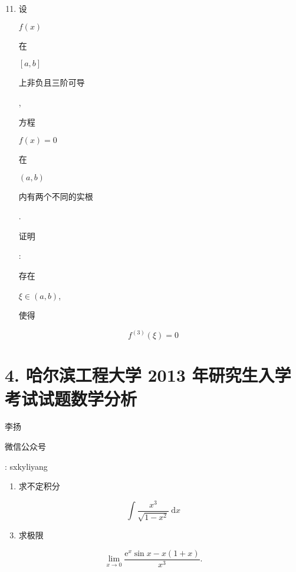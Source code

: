 \documentclass[10pt]{article}
\begin{document}
\begin{enumerate}
  \setcounter{enumi}{10}
  \item \begin{CJK}{UTF8}{mj}设\end{CJK} $f(x)$ \begin{CJK}{UTF8}{mj}在\end{CJK} $[a, b]$ \begin{CJK}{UTF8}{mj}上非负且三阶可导\end{CJK}, \begin{CJK}{UTF8}{mj}方程\end{CJK} $f(x)=0$ \begin{CJK}{UTF8}{mj}在\end{CJK} $(a, b)$ \begin{CJK}{UTF8}{mj}内有两个不同的实根\end{CJK}. \begin{CJK}{UTF8}{mj}证明\end{CJK}: \begin{CJK}{UTF8}{mj}存在\end{CJK} $\xi \in(a, b)$, \begin{CJK}{UTF8}{mj}使得\end{CJK}
\end{enumerate}
$$
f^{(3)}(\xi)=0
$$

\section{4. 哈尔滨工程大学 2013 年研究生入学考试试题数学分析}
\begin{CJK}{UTF8}{mj}李扬\end{CJK}

\begin{CJK}{UTF8}{mj}微信公众号\end{CJK}: sxkyliyang

\begin{enumerate}
  \item \begin{CJK}{UTF8}{mj}求不定积分\end{CJK}
\end{enumerate}
$$
\int \frac{x^{3}}{\sqrt{1-x^{2}}} \mathrm{~d} x
$$

\begin{enumerate}
  \setcounter{enumi}{2}
  \item \begin{CJK}{UTF8}{mj}求极限\end{CJK}
\end{enumerate}
$$
\lim _{x \rightarrow 0} \frac{\mathrm{e}^{x} \sin x-x(1+x)}{x^{3}} .
$$
\end{document}
